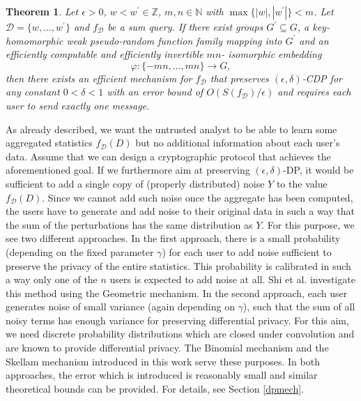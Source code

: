 \documentclass[10pt]{extarticle}
\newtheorem{Thm}{Theorem}
\begin{document}
\begin{Thm}\label{mainthm} Let $\epsilon>0$, $w<w^\prime\in\mathbb{Z}$, $m,n\in\mathbb{N}$ with $\max\{|w|,|w^\prime|\}<m$. Let\linebreak $\mathcal{D}=\{w,\ldots,w^\prime\}$ and $f_{\mathcal{D}}$ be a sum query. If there exist groups $G^\prime\subseteq G$, a key-homomorphic weak pseudo-random function family mapping into $G^\prime$ and an efficiently computable and efficiently invertible $mn$- isomorphic embedding \[\varphi:\{-mn,\ldots,mn\}\to G,\] then there exists an efficient mechanism for $f_{\mathcal{D}}$ that preserves $(\epsilon,\delta)$-\mbox{\upshape\sffamily CDP} for any constant $0<\delta<1$ with an error bound of $O(S(f_{\mathcal{D}})/\epsilon)$ and requires each user to send exactly one message.
\end{Thm}

As already described, we want the untrusted analyst to be able to learn some aggregated statistics $f_{\mathcal{D}}(D)$ but no additional information about each user's data. Assume that we can design a cryptographic protocol that achieves the aforementioned goal. If we furthermore aim at preserving $(\epsilon,\delta)$-\mbox{\upshape\sffamily DP}, it would be sufficient to add a single copy of (properly distributed) noise $Y$ to the value $f_{\mathcal{D}}(D)$. Since we cannot add such noise once the aggregate has been computed, the users have to generate and add noise to their original data in such a way that the sum of the perturbations has the same distribution as $Y$. For this purpose, we see two different approaches. In the first approach, there is a small probability (depending on the fixed parameter $\gamma$) for each user to add noise sufficient to preserve the privacy of the entire statistics. This probability is calibrated in such a way only one of the $n$ users is expected to add noise at all. Shi et al. \cite{2} investigate this method using the Geometric mechanism. In the second approach, each user generates noise of small variance (again depending on $\gamma$), such that the sum of all noisy terms has enough variance for preserving differential privacy. For this aim, we need discrete probability distributions which are closed under convolution and are known to provide differential privacy. The Binomial mechanism \cite{14} and the Skellam mechanism introduced in this work serve these purposes. In both approaches, the error which is introduced is reasonably small and similar theoretical bounds can be provided. For details, see Section \ref{dpmech}.
\end{document}
